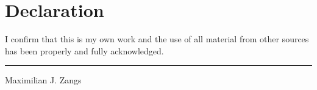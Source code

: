\chapter*{Declaration}

I confirm that this is my own work and the use of all material from other sources has been properly and fully acknowledged.

\vspace{4cm}

\noindent\rule{20em}{0.4pt}

Maximilian J. Zangs